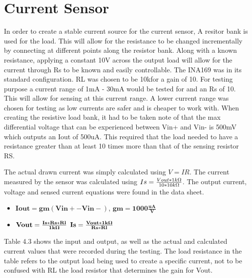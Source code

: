 \newpage
\section{Current Sensor}  
\vspace{-7mm}
In order to create a stable current source for the current sensor, A resitor bank is used for the load. This will allow for the resistance to be changed incrementally by connecting at different points along the resistor bank. Along with a known resistance, applying a constant 10V across the output load will allow for the current through Rs to be known and easily controllable. The INA169 was in its standard configuration. RL was chosen to be 10k\ohm for a gain of 10. For testing purpose a current range of 1mA - 30mA would be tested for and an Rs of 10\ohm. This will allow for sensing at this current range. A lower current range was chosen for testing as low currents are safer and is cheaper to work with. When creating the resistive load bank, it had to be taken note of that the max differential voltage that can be experienced between Vin+ and Vin- is 500mV which outputs an Iout of 500uA. This required that the load needed to have a resistance greater than at least 10 times more than that of the sensing resistor RS.

\vspace{-3mm}
The actual drawn current was simply calculated using $V=IR$. The current measured by the sensor was calculated using $Is =  \frac{Vout*1k\ohm }{10*10k\ohm}$. The output current, voltage and sensed current equations were found in the data sheet.
\vspace{-5mm}
\begin{itemize}
    \item[] $\mathbf{Iout = gm(Vin+ - Vin-)}$, \hspace{10mm} $\mathbf{gm = 1000\frac{uA}{V}}$
    \item[] $ \mathbf{Vout = \frac{Is*Rs*Rl}{1k\ohm}}$  \hspace{33mm} $ \mathbf{Is = \frac{Vout*1k\ohm}{Rs*Rl}}$
\end{itemize}

\vspace{-5mm}
Table 4.3 shows the input and output, as well as the actual and calculated current values that were recorded during the testing. The load resistance in the table refers to the output load being used to create a specific current, not to be confused with RL the load resistor that determines the gain for Vout.

